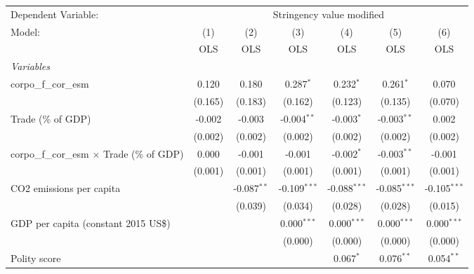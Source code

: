 
\begingroup
\centering
\begin{tabular}{lcccccc}
   \toprule
   Dependent Variable: & \multicolumn{6}{c}{Stringency value modified}\\
   Model:                                             & (1)     & (2)           & (3)            & (4)            & (5)            & (6)\\  
                                                      &  OLS    & OLS           & OLS            & OLS            & OLS            & OLS\\  
   \midrule
   \emph{Variables}\\
   corpo\_f\_cor\_esm                                 & 0.120   & 0.180         & 0.287$^{*}$    & 0.232$^{*}$    & 0.261$^{*}$    & 0.070\\   
                                                      & (0.165) & (0.183)       & (0.162)        & (0.123)        & (0.135)        & (0.070)\\   
   Trade (\% of GDP)                                  & -0.002  & -0.003        & -0.004$^{**}$  & -0.003$^{*}$   & -0.003$^{**}$  & 0.002\\   
                                                      & (0.002) & (0.002)       & (0.002)        & (0.002)        & (0.002)        & (0.002)\\   
   corpo\_f\_cor\_esm $\times$ Trade (\% of GDP)      & 0.000   & -0.001        & -0.001         & -0.002$^{*}$   & -0.003$^{**}$  & -0.001\\   
                                                      & (0.001) & (0.001)       & (0.001)        & (0.001)        & (0.001)        & (0.001)\\   
   CO2 emissions per capita                           &         & -0.087$^{**}$ & -0.109$^{***}$ & -0.088$^{***}$ & -0.085$^{***}$ & -0.105$^{***}$\\   
                                                      &         & (0.039)       & (0.034)        & (0.028)        & (0.028)        & (0.015)\\   
   GDP per capita (constant 2015 US\$)                &         &               & 0.000$^{***}$  & 0.000$^{***}$  & 0.000$^{***}$  & 0.000$^{***}$\\   
                                                      &         &               & (0.000)        & (0.000)        & (0.000)        & (0.000)\\   
   Polity score                                       &         &               &                & 0.067$^{*}$    & 0.076$^{**}$   & 0.054$^{**}$\\   

\end{tabular}

